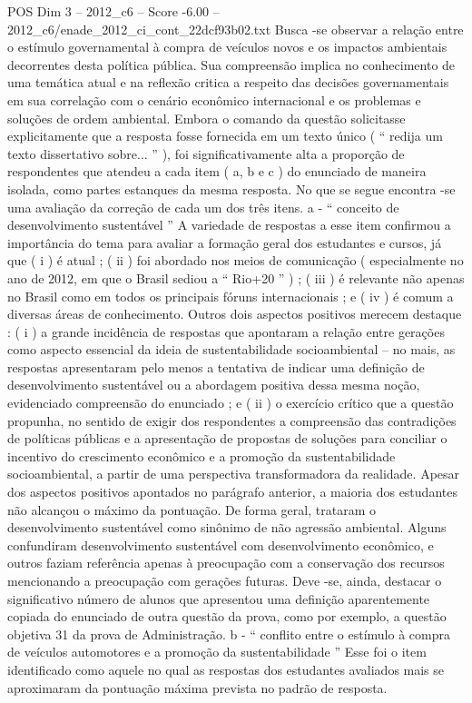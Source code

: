\begin{textsample}{POS Dim 3 – 2012\_c6 – Score -6.00 – 2012\_c6/enade\_2012\_ci\_cont\_22dcf93b02.txt}
Busca -se observar a relação entre o estímulo governamental à compra de veículos novos e os impactos ambientais decorrentes desta política pública.
Sua compreensão implica no conhecimento de uma temática atual e na reflexão critica a respeito das decisões governamentais em sua correlação com o cenário econômico internacional e os problemas e soluções de ordem ambiental.
Embora o comando da questão solicitasse explicitamente que a resposta fosse fornecida em um texto único ( “ redija um texto dissertativo sobre... ” ), foi significativamente alta a proporção de respondentes que atendeu a cada item ( a, b e c ) do enunciado de maneira isolada, como partes estanques da mesma resposta.
No que se segue encontra -se uma avaliação da correção de cada um dos três itens. a - “ conceito de desenvolvimento sustentável ” A variedade de respostas a esse item confirmou a importância do tema para avaliar a formação geral dos estudantes e cursos, já que ( i ) é atual ; ( ii ) foi abordado nos meios de comunicação ( especialmente no ano de 2012, em que o Brasil sediou a “ Rio+20 ” ) ; ( iii ) é relevante não apenas no Brasil como em todos os principais fóruns internacionais ; e ( iv ) é comum a diversas áreas de conhecimento.
Outros dois aspectos positivos merecem destaque : ( i ) a grande incidência de respostas que apontaram a relação entre gerações como aspecto essencial da ideia de sustentabilidade socioambiental – no mais, as respostas apresentaram pelo menos a tentativa de indicar uma definição de desenvolvimento sustentável ou a abordagem positiva dessa mesma noção, evidenciado compreensão do enunciado ; e ( ii ) o exercício crítico que a questão propunha, no sentido de exigir dos respondentes a compreensão das contradições de políticas públicas e a apresentação de propostas de soluções para conciliar o incentivo do crescimento econômico e a promoção da sustentabilidade socioambiental, a partir de uma perspectiva transformadora da realidade.
Apesar dos aspectos positivos apontados no parágrafo anterior, a maioria dos estudantes não alcançou o máximo da pontuação.
De forma geral, trataram o desenvolvimento sustentável como sinônimo de não agressão ambiental.
Alguns confundiram desenvolvimento sustentável com desenvolvimento econômico, e outros faziam referência apenas à preocupação com a conservação dos recursos mencionando a preocupação com gerações futuras.
Deve -se, ainda, destacar o significativo número de alunos que apresentou uma definição aparentemente copiada do enunciado de outra questão da prova, como por exemplo, a questão objetiva 31 da prova de Administração. b - “ conflito entre o estímulo à compra de veículos automotores e a promoção da sustentabilidade ” Esse foi o item identificado como aquele no qual as respostas dos estudantes avaliados mais se aproximaram da pontuação máxima prevista no padrão de resposta.

\end{textsample}
